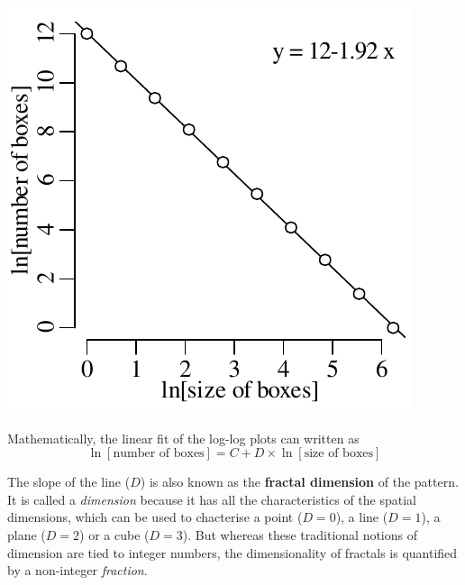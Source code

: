 \noindent\begin{minipage}[t][][b]{.3\textwidth}
  \includegraphics[width=\textwidth]{../figures/sierpinskiboxcounts.pdf}\\
\end{minipage}
\begin{minipage}[t][][t]{.7\textwidth}
  \label{fig:sierpinskiboxcounts}
\end{minipage}

Mathematically, the linear fit of the log-log plots can written as
\begin{equation}
  \ln[\mbox{number of boxes}] = C + D \times \ln[\mbox{size of boxes}]
  \label{eq:fractaldim}
\end{equation}

The slope of the line ($D$) is also known as the \textbf{fractal
  dimension} of the pattern. It is called a \emph{dimension} because
it has all the characteristics of the spatial dimensions, which can be
used to chacterise a point ($D=0$), a line ($D=1$), a plane ($D=2$) or
a cube ($D=3$). But whereas these traditional notions of  dimension
are tied to integer numbers, the dimensionality of fractals
is quantified by a non-integer \emph{fraction}.\\

